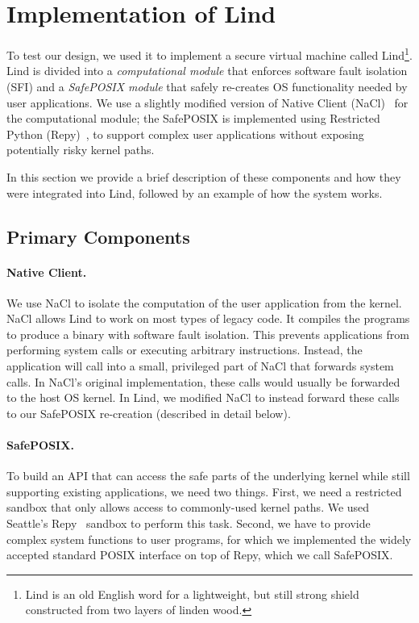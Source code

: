 \section{Implementation of Lind}
\label{sec.implementation}

To test our \lip design, we used it to implement a secure virtual machine
called Lind\footnote{\scriptsize Lind is an old English word for a lightweight, but still strong shield
constructed from two layers of linden wood.}. Lind is divided into a
\emph{computational module} that enforces software fault isolation (SFI) and a
\emph{SafePOSIX module} that safely re-creates OS functionality needed by user
applications. We use a slightly modified version of Native Client
(NaCl)~\cite{NaCl-09} for the computational module; the SafePOSIX is
implemented using Restricted Python (Repy)~\cite{Repy-10}, to support
complex user applications without exposing potentially risky kernel paths.

In this section we provide a brief description of these components and how they
were integrated into Lind, followed by an example of how the system works.

\subsection{Primary Components}

\paragraph{Native Client.}
We use NaCl to isolate the computation of the user application
from the kernel. NaCl allows Lind to work on most types of legacy code.
It compiles the programs to produce a binary with software fault isolation.
This prevents applications from performing system calls
or executing arbitrary instructions.
Instead, the application will call into a small, privileged
part of NaCl that forwards system calls. In NaCl's original implementation,
these calls would usually be forwarded to the host OS kernel. In Lind, we
modified NaCl to instead forward these calls to our SafePOSIX re-creation 
(described in detail below).

\paragraph{SafePOSIX.}

To build an API that can access the safe parts of the underlying kernel while
still supporting existing applications, we need two things. First, we need a
restricted sandbox that only allows access to commonly-used kernel paths. We
used Seattle's Repy~\cite{Repy-10} sandbox to perform this task. Second, we
have to provide complex system functions to user programs,
for which we implemented the widely accepted standard POSIX interface on top of Repy, 
which we call SafePOSIX. 

